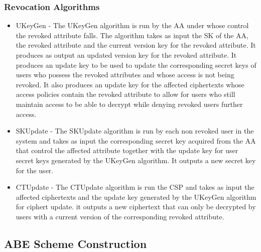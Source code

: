 \subsubsection*{Revocation Algorithms}
\begin{itemize}
	\item UKeyGen - The UKeyGen algorithm is run by the AA under whose control the revoked attribute falls. The algorithm takes as input the SK of the AA, the revoked attribute and the current version key for the revoked attribute. It produces as output an updated version key for the revoked attribute. It produces an update key to be used to update the corresponding secret keys of users who possess the revoked attributes and whose access is not being revoked. It also produces an update key for the affected ciphertexts whose access policies contain the revoked attribute to allow for users who still maintain access to be able to decrypt while denying revoked users further access.
	
	\item SKUpdate - The SKUpdate algorithm is run by each non revoked user in the system and takes as input the corresponding secret key acquired from the AA that control the affected attribute together with the update key for user secret keys generated by the UKeyGen algorithm. It outputs a new secret key for the user.
	
	\item CTUpdate - The CTUpdate algorithm is run the CSP and takes as input the affected ciphertexts  and the update key generated by the UKeyGen algorithm for ciphert update. it outputs a new ciphertext that can only be decrypted by users with a current version of the corresponding revoked attribute.
	
\end{itemize}



\subsection{ABE Scheme Construction}


